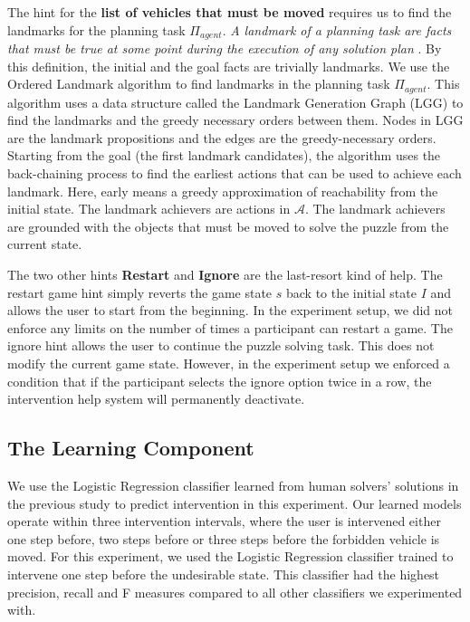 \documentclass[doctor]{thesis} %
\theoremstyle{plain}
\begin{document}
The hint for the \textbf{list of vehicles that must be moved} requires us to find the landmarks for the planning task $\Pi_{agent}$. \textit{A landmark of a planning task are facts that must be true at some point during the execution of any solution plan} \cite{hoffman2004lm}. By this definition, the initial and the goal facts are trivially landmarks. We use the Ordered Landmark algorithm  to find landmarks in the planning task $\Pi_{agent}$. This algorithm uses a data structure called the Landmark Generation Graph (LGG) to find the landmarks and the greedy necessary orders between them. Nodes in LGG are the landmark propositions and the edges are the greedy-necessary orders. Starting from the goal (the first landmark candidates), the algorithm uses the back-chaining process to find the earliest actions that can be used to achieve each landmark. Here, early means a greedy approximation of reachability from the initial state. The landmark achievers are actions in $\mathcal{A}$. The landmark achievers are grounded with the objects that must be moved to solve the puzzle from the current state.

The two other hints \textbf{Restart} and \textbf{Ignore} are the last-resort kind of help. The restart game hint simply reverts the game state $s$ back to the initial state $I$ and allows the user to start from the beginning. In the experiment setup, we did not enforce any limits on the number of times a participant can restart a game. The ignore hint allows the user to continue the puzzle solving task. This does not modify the current game state. However, in the experiment setup we enforced a condition that if the participant selects the ignore option twice in a row, the intervention help system will permanently deactivate.

\subsection*{The Learning Component}
We use the Logistic Regression classifier learned from human solvers' solutions in the previous study to predict intervention in this experiment. Our learned models operate within three intervention intervals, where the user is intervened either one step before, two steps before or three steps before the forbidden vehicle is moved. For this experiment, we used the Logistic Regression classifier trained to intervene one step before the undesirable state. This classifier had the highest precision, recall and F measures compared to all other classifiers we experimented with.
\end{document}
